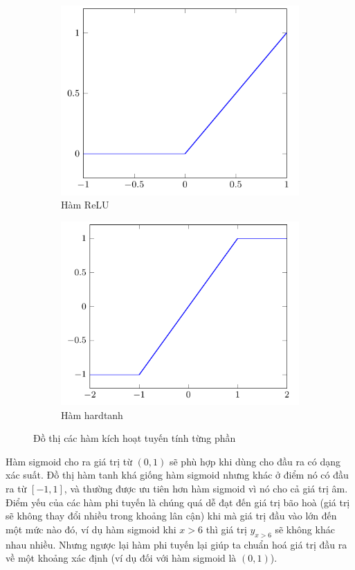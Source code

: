 \begin{figure}[htb]
    \centering
    \begin{subfigure}[b]{0.4\textwidth}
        \centering
        \includegraphics[width=\textwidth]{tikz_image/reLU.pdf}
        \caption{Hàm ReLU}
    \end{subfigure}%
    \begin{subfigure}[b]{0.4\textwidth}
        \centering
        \includegraphics[width=\textwidth]{tikz_image/hardtanh.pdf}
        \caption{Hàm hardtanh}
    \end{subfigure}%
    \caption{Đồ thị các hàm kích hoạt tuyến tính từng phần}
    \label{figure:activation-function-2}
\end{figure}
Hàm sigmoid cho ra giá trị từ $(0,1)$ sẽ phù hợp khi dùng cho đầu ra có dạng xác suất. Đồ thị hàm tanh khá giống hàm sigmoid nhưng khác ở điểm nó có đầu ra từ $[-1,1]$, và thường được ưu tiên hơn hàm sigmoid vì nó cho cả giá trị âm. Điểm yếu của các hàm phi tuyến là chúng quá dễ đạt đến giá trị bão hoà (giá trị sẽ không thay đổi nhiều trong khoảng lân cận) khi mà giá trị đầu vào lớn đến một mức nào đó, ví dụ hàm sigmoid khi $x>6$ thì giá trị $y_{x>6}$ sẽ không khác nhau nhiều. Nhưng ngược lại hàm phi tuyến lại giúp ta chuẩn hoá giá trị đầu ra về một khoảng xác định (ví dụ đối với hàm sigmoid là $(0,1)$).

